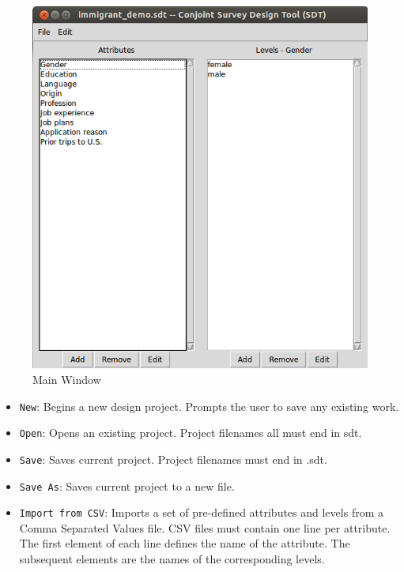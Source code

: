 \documentclass[12pt]{article}
\begin{document}
\begin{figure}[ht!]
\centering\includegraphics[scale=.6]{graphics/main_window.png}
\caption{Main Window}
\end{figure}

\begin{itemize}
\item \texttt{New}: Begins a new design project. Prompts the user to save any existing work.
\item \texttt{Open}: Opens an existing project. Project filenames all must end in sdt.
\item \texttt{Save}: Saves current project. Project filenames must end in .sdt.
\item \texttt{Save As}: Saves current project to a new file.
\item \texttt{Import from CSV}: Imports a set of pre-defined attributes and levels from a Comma Separated Values file. CSV files must contain one line per attribute. The first element of each line defines the name of the attribute. The subsequent elements are the names of the corresponding levels.
\end{itemize}
\end{document}
